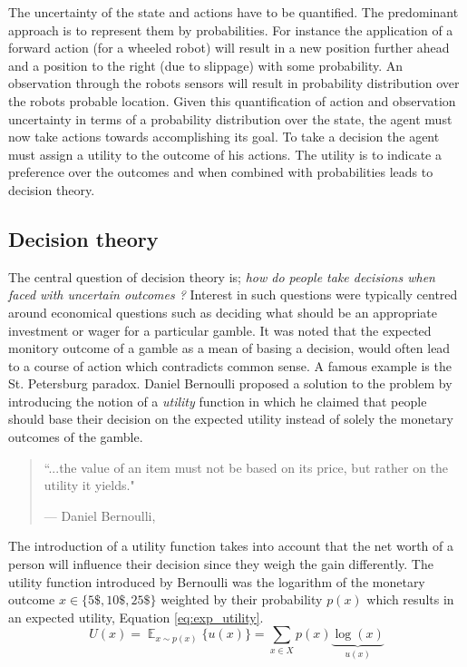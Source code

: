 The uncertainty of the state and actions have to be quantified. The predominant approach 
is to  represent them by probabilities. For instance the application of a forward action (for a wheeled robot) 
will result in a new position further ahead and a position to the right (due to slippage) with some probability.
An observation through the robots sensors will result in probability distribution over the robots probable location.
Given this quantification of action and observation uncertainty in terms of a probability distribution over the state, 
the agent must now take actions towards accomplishing its goal. To take a decision the agent must assign a utility 
to the outcome of his actions. The utility is to indicate a preference over the outcomes and when combined with 
probabilities leads to decision theory. 

\subsection{Decision theory}

The central question of decision theory is; \textit{how do people take decisions when faced with uncertain outcomes ?} Interest 
in such questions were typically centred around economical questions such as deciding what should be an appropriate 
investment or wager for a particular gamble. It was noted that the expected monitory outcome of a gamble as a mean of basing a decision, 
would often lead to a course of action which contradicts common sense. A famous example is the St. Petersburg paradox. Daniel Bernoulli 
proposed a solution to the problem by introducing the notion of a \textit{utility} function in which he claimed that people should base 
their decision on the expected utility instead of solely the monetary outcomes of the gamble.

\begin{quote}
  \onehalfspacing%
  ``...the value of an item must not be based on its price, but rather on the utility it yields."\par\raggedleft--- \textup{Daniel Bernoulli},\cite{Bernoulli1954}
\end{quote}

The introduction of a utility function takes into account that the net worth of a person will influence their decision since they weigh
the gain differently. The utility function introduced by Bernoulli was the logarithm of the monetary 
outcome $x\in \{5\$,10\$,25\$\}$ weighted by their probability $p(x)$ which results in an expected utility, Equation \ref{eq:exp_utility}.
\begin{equation}\label{eq:exp_utility}
  U(x) = \displaystyle \mathop{\mathbb{E}}_{x \sim p(x)} \{ u(x) \} = \sum_{x\in X} p(x) \underbrace{\log(x)}_{u(x)}
\end{equation}

